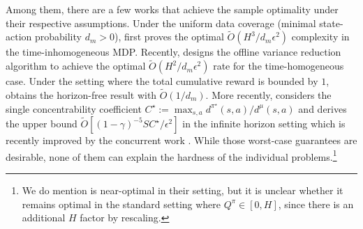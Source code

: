 Among them, there are a few works that achieve the sample optimality under their respective assumptions. Under the uniform data coverage (minimal state-action probability $d_m>0$), \cite{yin2021near} first proves the optimal $\tilde{O}(H^3/d_m\epsilon^2)$ complexity in the time-inhomogeneous MDP. Recently, \cite{yin2021nearoptimal} designs the offline variance reduction algorithm to achieve the optimal $\tilde{O}(H^2/d_m\epsilon^2)$ rate for the time-homogeneous case.  Under the setting where the total cumulative reward is bounded by $1$, \cite{ren2021nearly} obtains the horizon-free result with $\tilde{O}(1/d_m)$. More recently, \cite{rashidinejad2021bridging} considers the single concentrability coefficient $C^\star:=\max_{s,a}{d^{\pi^\star}(s,a)}/{d^\mu(s,a)}$ and derives the upper bound $\tilde{O}[(1-\gamma)^{-5}SC^\star/\epsilon^2]$ in the infinite horizon setting which is recently improved by the concurrent work \cite{xie2021policy}. While those worst-case guarantees are desirable, none of them can explain the hardness of the individual problems.\footnote{We do mention \cite{zanette2021provable} is near-optimal in their setting, but it is unclear whether it remains optimal in the standard setting where $Q^\pi\in[0,H]$, since there is an additional $H$ factor by rescaling.}


